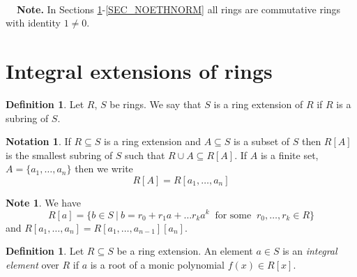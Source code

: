 \documentclass[12pt, letterpaper, oneside]{article}
\theoremstyle{plain}
\theoremstyle{definition}
\newtheorem{definition}[theorem]{Definition}
\newtheorem{notation}[theorem]{Notation}
\newtheorem{note}[theorem]{Note}
\newcommand{\vs}{\vskip 5mm}
\begin{document}


\newpage


\begin{framed}
\ \\
\textbf{\ \ Note.} In Sections \ref{SEC_INTEGRALEXT}-\ref{SEC_NOETHNORM}
all rings are commutative rings  with   identity $1\neq 0$. \\
\end{framed}





\section{Integral extensions of rings}
\label{SEC_INTEGRALEXT}


\begin{definition}
Let $R$, $S$ be rings.  We say that $S$ is a ring extension of $R$ if $R$ is a subring 
of $S$. 
\end{definition}

\vs\vs

\begin{notation}
If $R\subseteq S$ is a ring extension and $A\subseteq S$ is a subset of $S$ then 
$R[A]$ is the smallest subring of $S$ such that $R\cup A\subseteq R[A]$. If 
$A$ is a finite set,  $A= \{a_{1}, \dots, a_{n}\}$ then we write 
$$R[A] = R[a_{1}, \dots, a_{n}]$$
\end{notation}

\begin{note}
We have 
$$R[a] = \{ b\in S \ | \ b= r_{0} + r_{1}a + {\dots} r_{k}a^{k} \ \text{ for some } \ r_{0}, \dots, r_{k} \in R \}$$
and $R[a_{1}, \dots, a_{n}] = R[a_{1}, \dots, a_{n-1}][a_{n}]$. 
\end{note}


\vs\vs

\begin{definition}
Let  $R\subseteq S$ be a ring extension. An element $a\in S$ is 
an  \emph{integral element} over $R$ if $a$ is a root of a monic polynomial $f(x)\in R[x]$.  
\end{definition}

\vs\vs
\end{document}
